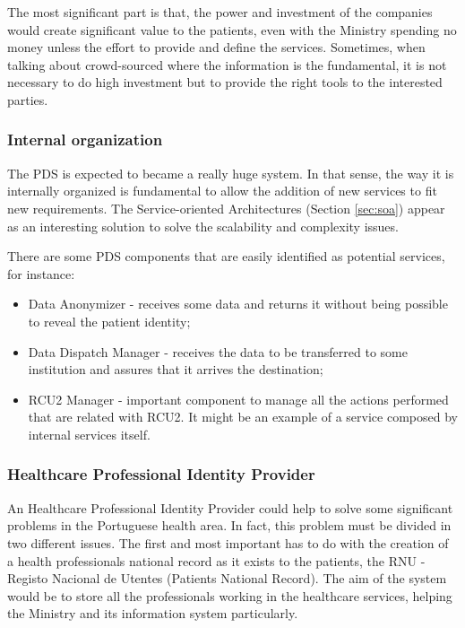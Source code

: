 The most significant part is that, the power and investment of the companies would create significant value to the patients, even with the Ministry spending no money unless the effort to provide and define the services. Sometimes, when talking about crowd-sourced where the information is the fundamental, it is not necessary to do high investment but to provide the right tools to the interested parties.


\subsubsection{Internal organization}

The PDS is expected to became a really huge system. In that sense, the way it is internally organized is fundamental to allow the addition of new services to fit new requirements. The Service-oriented Architectures (Section \ref{sec:soa}) appear as an interesting solution to solve the scalability and complexity issues.

There are some PDS components that are easily identified as potential services, for instance:
\begin{itemize}
\item Data Anonymizer - receives some data and returns it without being possible to reveal the patient identity;
\item Data Dispatch Manager - receives the data to be transferred to some institution and assures that it arrives the destination;
\item RCU2 Manager - important component to manage all the actions performed that are related with RCU2. It might be an example of a service composed by internal services itself.
\end{itemize}


\subsubsection{Healthcare Professional Identity Provider}

An Healthcare Professional Identity Provider could help to solve some significant problems in the Portuguese health area. In fact, this problem must be divided in two different issues. The first and most important has to do with the creation of a health professionals national record as it exists to the patients, the RNU - Registo Nacional de Utentes (Patients National Record). The aim of the system would be to store all the professionals working in the healthcare services, helping the Ministry and its information system particularly.

